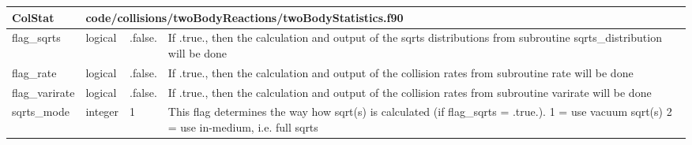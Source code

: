 \documentclass{article}
\begin{document}

\begin{longtable}{llll}
\toprule
\textbf{\large{ColStat}} & \multicolumn{3}{l}{\footnotesize{code/collisions/twoBodyReactions/twoBodyStatistics.f90}}\\*
\midrule
\endfirsthead
\midrule
\endhead
flag\_sqrts & \begin{minipage}[t]{2cm}logical\end{minipage} & \begin{minipage}[t]{2cm}.false.\end{minipage} & \begin{minipage}[t]{12cm}If .true., then the calculation and output of the sqrts distributions from subroutine sqrts\_distribution will be done\end{minipage}\\*
\midrule
flag\_rate & \begin{minipage}[t]{2cm}logical\end{minipage} & \begin{minipage}[t]{2cm}.false.\end{minipage} & \begin{minipage}[t]{12cm}If .true., then the calculation and output of the collision rates from subroutine rate will be done\end{minipage}\\*
\midrule
flag\_varirate & \begin{minipage}[t]{2cm}logical\end{minipage} & \begin{minipage}[t]{2cm}.false.\end{minipage} & \begin{minipage}[t]{12cm}If .true., then the calculation and output of the collision rates from subroutine varirate will be done\end{minipage}\\*
\midrule
sqrts\_mode & \begin{minipage}[t]{2cm}integer\end{minipage} & \begin{minipage}[t]{2cm}1\end{minipage} & \begin{minipage}[t]{12cm}This flag determines the way how sqrt(s) is calculated (if flag\_sqrts = .true.). 1 = use vacuum sqrt(s) 2 = use in-medium, i.e. full sqrts\end{minipage}\\*
\midrule

\end{longtable}
\end{document}
